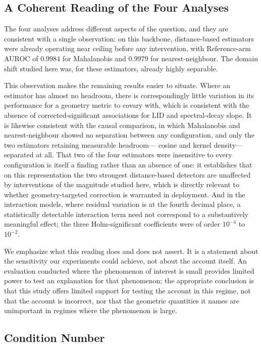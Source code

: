 \subsection{A Coherent Reading of the Four Analyses}

The four analyses address different aspects of the question, and they are
consistent with a single observation: on this backbone, distance-based
estimators were already operating near ceiling before any intervention, with
Reference-arm AUROC of $0.9984$ for Mahalanobis and $0.9979$ for
nearest-neighbour. The domain shift studied here was, for these estimators,
already highly separable.

This observation makes the remaining results easier to situate. Where an
estimator has almost no headroom, there is correspondingly little variation
in its performance for a geometry metric to covary with, which is consistent
with the absence of corrected-significant associations for LID and
spectral-decay slope. It is likewise consistent with the causal comparison,
in which Mahalanobis and nearest-neighbour showed no separation between any
configuration, and only the two estimators retaining measurable headroom---
cosine and kernel density---separated at all. That two of the four estimators
were insensitive to every configuration is itself a finding rather than an
absence of one: it establishes that on this representation the two strongest
distance-based detectors are unaffected by interventions of the magnitude
studied here, which is directly relevant to whether geometry-targeted
correction is warranted in deployment. And in the interaction models,
where residual variation is at the fourth decimal place, a statistically
detectable interaction term need not correspond to a substantively meaningful
effect; the three Holm-significant coefficients were of order $10^{-4}$ to
$10^{-2}$.

We emphasize what this reading does and does not assert. It is a statement
about the sensitivity our experiments could achieve, not about the account
itself. An evaluation conducted where the phenomenon of interest is small
provides limited power to test an explanation for that phenomenon; the
appropriate conclusion is that this study offers limited support for testing
the account in this regime, not that the account is incorrect, nor that
the geometric quantities it names are unimportant in regimes where the
phenomenon is large.

\subsection{Condition Number}

